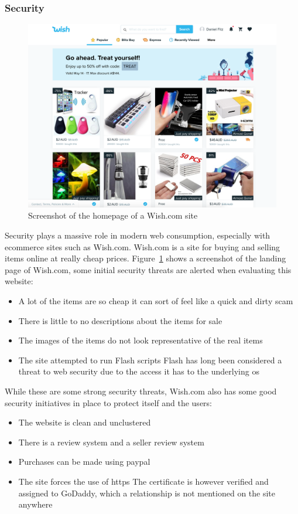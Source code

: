 \subsubsection{Security}
\begin{figure}
	\centering
	\includegraphics[width=0.8\linewidth]{wish}
	\caption{Screenshot of the homepage of a Wish.com site}\label{fig:wish}
\end{figure}
Security plays a massive role in modern web consumption, especially with ecommerce sites such as Wish.com. Wish.com is a site for buying and selling items online at really cheap prices. Figure~\ref{fig:wish} shows a screenshot of the landing page of Wish.com, some initial security threats are alerted when evaluating this website:
\begin{itemize}
	\item A lot of the items are so cheap it can sort of feel like a quick and dirty scam
	\item There is little to no descriptions about the items for sale
	\item The images of the items do not look representative of the real items
	\item The site attempted to run Flash scripts
	\subitem Flash has long been considered a threat to web security due to the access it has to the underlying \gls{os}	
\end{itemize}
While these are some strong security threats, Wish.com also has some good security initiatives in place to protect itself and the users:
\begin{itemize}
	\item The website is clean and unclustered
	\item There is a review system and a seller review system
	\item Purchases can be made using \gls{paypal}
	\item The site forces the use of \gls{https}
	\subitem The certificate is however verified and assigned to GoDaddy, which a relationship is not mentioned on the site anywhere	
\end{itemize}

